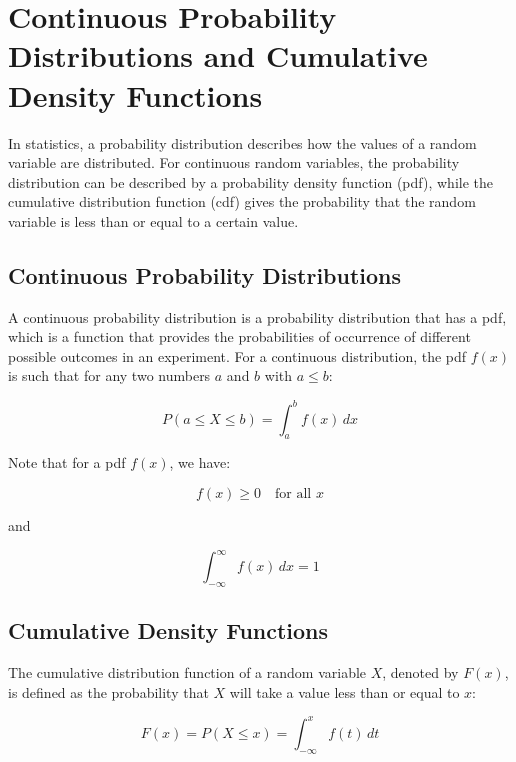 \chapter{Continuous Probability Distributions and Cumulative Density Functions}

In statistics, a probability distribution describes how the values of
a random variable are distributed. For continuous random variables,
the probability distribution can be described by a probability density
function (pdf), while the cumulative distribution function (cdf) gives
the probability that the random variable is less than or equal to a
certain value.   

\section{Continuous Probability Distributions}

A continuous probability distribution is a probability distribution
that has a pdf, which is a function that provides the probabilities of
occurrence of different possible outcomes in an experiment. For a
continuous distribution, the pdf $f(x)$ is such that for any two
numbers $a$ and $b$ with $a \leq b$:

\begin{equation}
P(a \leq X \leq b) = \int_{a}^{b} f(x) \, dx
\end{equation}

Note that for a pdf $f(x)$, we have:

\begin{equation}
f(x) \geq 0 \quad \text{for all } x
\end{equation}

and

\begin{equation}
\int_{-\infty}^{\infty} f(x) \, dx = 1
\end{equation}

\section{Cumulative Density Functions}

The cumulative distribution function of a random variable $X$, denoted
by $F(x)$, is defined as the probability that $X$ will take a value
less than or equal to $x$:

\begin{equation}
F(x) = P(X \leq x) = \int_{-\infty}^{x} f(t) \, dt
\end{equation}

